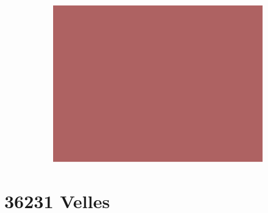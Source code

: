 \documentclass{article}
\begin{document}
\begin{figure}[H]
\begin{subfigure}[b]{0.32\textwidth}
    \end{subfigure}
    \begin{subfigure}[b]{0.32\textwidth}
        \centering
        \includegraphics[width=\linewidth]{ir38_184_h2.png} %
    \end{subfigure}
\end{figure}

\vspace{-1em}
\section*{36231 Velles}
\vspace{-1em}
\end{document}
